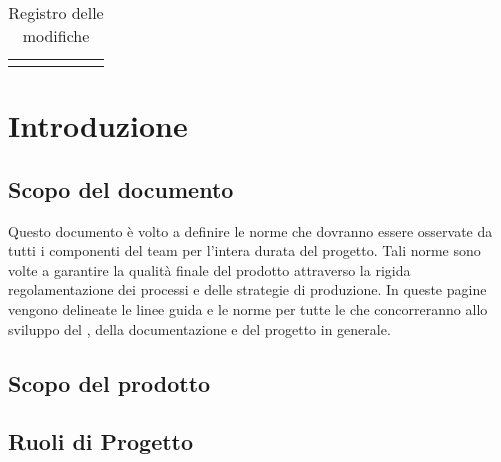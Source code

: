 \begin{center}
\begin{longtable}{|c|c|c|p{0.5\linewidth}|}
\bottomrule
\caption{Registro delle modifiche}
\label{tab:changelog}
\end{longtable}
\end{center}

\newpage
\tableofcontents


\newpage
\section{Introduzione}%
\label{1.0}
\subsection{Scopo del documento}%
\label{1.1}
Questo documento è volto a definire le norme che dovranno essere osservate da tutti i componenti del team per l'intera durata del progetto. Tali norme sono volte a garantire la qualità finale del prodotto attraverso la rigida regolamentazione dei processi e delle strategie di produzione. In queste pagine vengono delineate le linee guida e le norme per tutte le  che concorreranno allo sviluppo del , della documentazione e del progetto in generale.

\subsection{Scopo del prodotto}
\label{1.2}
\Prodotto{}

\subsection{Ruoli di Progetto}

